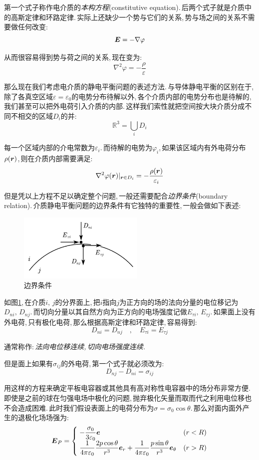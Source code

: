 第一个式子称作电介质的\emph{本构方程}(constitutive equation).\,后两个式子就是介质中的高斯定律和环路定律.\,实际上还缺少一个势与它们的关系,\,势与场之间的关系不需要做任何改变:
\[\boldsymbol{E}=-\nabla \varphi\]

从而很容易得到势与荷之间的关系,\,现在变为:
\[\nabla^2\varphi=-\frac{\rho}{\varepsilon}\]

那么现在我们考虑电介质的静电平衡问题的表述方法.\,与导体静电平衡的区别在于,\,除了各真空区域$\varepsilon=\varepsilon_0$的电势分布待解以外,\,各个介质内部的电势分布也是待解的,\,我们甚至可以把外电荷引入介质的内部.\,这样我们索性就把空间按大块介质分成不同不相交的区域$D_i$的并:
\[\mathbb{R}^3=\bigcup_i D_i\]

每一个区域内部的介电常数为$\varepsilon_i$.\,而待解的电势为$\varphi_i$,\,如果该区域内有外电荷分布$\rho(\boldsymbol{r})$,\,则在介质内部需要满足:
\[\nabla^2\varphi(\boldsymbol{r})|_{\boldsymbol{r}\in D_i}=-\frac{\rho(\boldsymbol{r})}{\varepsilon_i}\]

但是凭以上方程不足以确定整个问题,\,一般还需要配合\emph{边界条件}(boundary relation).\,介质静电平衡问题的边界条件有它独特的重要性,\,一般会做如下表述:

\begin{figure}
\vspace{-0.3cm}
\centering
\includegraphics[width=6cm]{image/7-2-14.png}
\caption{边界条件}\label{fig7-2-14}
\end{figure}
如图\ref{fig7-2-14},\,在介质$i,\,j$的分界面上,\,把$i$指向$j$为正方向的场的法向分量的电位移记为$D_{ni},\,D_{nj}$.\,而切向分量以其自然方向为正方向的电场强度记做$E_{\tau i},\,E_{\tau j}$.\,如果面上没有外电荷,\,只有极化电荷,\,那么根据高斯定律和环路定律,\,容易得到:
\[D_{ni}=D_{nj}\quad ,\quad E_{\tau i}=E_{\tau j}\]

通常称作:\,\emph{法向电位移连续,\,切向电场强度连续.}

但是面上如果有$\sigma_{ij}$的外电荷,\,第一个式子就必须改为:
\[D_{nj}-D_{ni}=\sigma_{ij}\]

用这样的方程来确定平板电容器或其他具有高对称性电容器中的场分布非常方便.\,即使是之前的球在匀强电场中极化的问题,\,抛弃极化矢量而取而代之利用电位移也不会造成困难.\,此时我们假设表面上的电荷分布为$\sigma=\sigma_0 \cos\theta$.\,那么对面内面外产生的退极化场场强为:
\[\boldsymbol{E}_P=\begin{cases}\displaystyle\;-\frac{\sigma_0	}{3\varepsilon_0} \boldsymbol{e}&(r<R)\\\displaystyle \; \frac{1}{4\pi\varepsilon_0} \frac{2p\cos\theta }{r^3}\boldsymbol{e}_r+\frac{1}{4\pi\varepsilon_0} \frac{p\sin\theta }{r^3}\boldsymbol{e}_\theta&(r>R)\end{cases}\]

